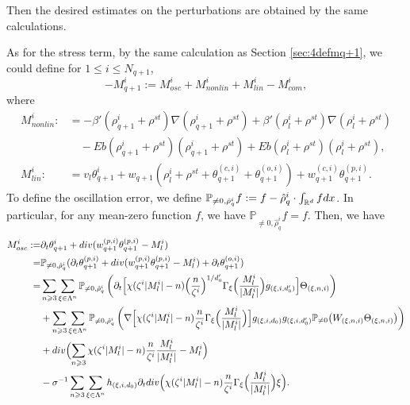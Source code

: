 \documentclass[10pt,a4paper]{amsart}
\numberwithin{equation}{section}
\def\dif{{\mathord{{\rm d}}}}
\def\geq{\geqslant}
\def\leq{\leqslant}
\def\div{\mathord{{\rm div}}}
\def\dif{{\mathord{{\rm d}}}}
\def\geq{\geqslant}
\def\leq{\leqslant}
\def\div{\mathord{{\rm div}}}
\begin{document}
 Then the desired estimates on the perturbations are obtained by the same calculations.
  
 
 As for the stress term, by the same calculation as Section \ref{sec:4defmq+1}, we could  define  for $1\leq i\leq N_{q+1}$,
$$-{M}^i _{q+1}:=M^i_{osc}+M^i_{nonlin}+M^i_{lin}-M^i_{com},$$
where \begin{align*} 
M^{i}_{nonlin}:&= -  \beta'(\rho^{i}_{q+1}+\rho^{st}) \nabla(\rho^{i}_{q+1}+\rho^{st})+\beta'(\rho^{i}_{l}+\rho^{st})\nabla (\rho^{i}_{l}+\rho^{st} )\\
&\quad-Eb( \rho_{q+1}^i+\rho^{st})(\rho_{q+1}^i+\rho^{st})+Eb(\rho_{l}^i+\rho^{st})(\rho_{l}^i+\rho^{st}),\\
M^{i}_{lin}:&=v_l\theta^{i}_{q+1}+w_{q+1}(\rho^{i}_l+\rho^{st}+\theta_{q+1}^{(c,i)}+\theta_{q+1}^{(o,i)}) +w_{q+1}^{(c,i)}\theta_{q+1}^{(p,i)}.
\end{align*}
 To define the oscillation error,  we define
$\mathbb{P}_{\neq 0,\hat{\rho}^i_q}f:=f- \hat{\rho}^i_q\cdot\int_{\mathbb{R}^d}f\dif x$.  
In particular, for any mean-zero function $f$, we have 
 $\mathbb{P}_{\neq 0,\hat{\rho}^i_q}f=f$. Then, we have 
\begin{align}
M^{i}_{osc}:= &\partial_t\theta^{i}_{q+1}+\div (w_{q+1}^{(p,i)}\theta_{q+1}^{(p,i)}-M^{i}_l)\notag\\
 =&\mathbb{P}_{\neq 0,\hat{\rho}^i_q} (\partial_t\theta^{(p,i)}_{q+1}+\div (w_{q+1}^{(p,i)}\theta_{q+1}^{(p,i)}-M^{i}_l)+\partial_t\theta^{(o,i)}_{q+1}
 )\notag\\ 
=
&
\sum_{n\geq3}
\sum_{\xi\in\Lambda^n}
\mathbb{P}_{\neq 0,\hat{\rho}^i_q}\left(\partial_t
\Bigl[
\chi(\zeta^i|M_l^i|-n)
\Bigl(\frac{n}{\zeta^i}\Bigr)^{1/d_0'}
\Gamma_\xi\Bigl(\frac{M_l^i}{|M_l^i|}\Bigr)
g_{(\xi,i,d_0')}
\Bigr]
\Theta_{(\xi,n,i)}\right)
\notag\\
&+
\sum_{n\geq3}
\sum_{\xi\in\Lambda^n}
\mathbb{P}_{\neq 0,\hat{\rho}^i_q}\left(\nabla
\Bigl[
\chi(\zeta^i|M_l^i|-n)
\frac{n}{\zeta^i}
\Gamma_\xi\Bigl(\frac{M_l^i}{|M_l^i|}\Bigr)
\Bigr]
g_{(\xi,i,d_0)}
g_{(\xi,i,d_0')}
\mathbb{P}_{\neq0}
\bigl(
W_{(\xi,n,i)}
\Theta_{(\xi,n,i)}
\bigr)
\right)\notag\\
&+
\div
\Bigl(
\sum_{n\geq3}
\chi(\zeta^i|M_l^i|-n)
\frac{n}{\zeta^i}
\frac{M_l^i}{|M_l^i|}
-
M_l^i
\Bigr)
\notag\\
&-
\sigma^{-1}
\sum_{n\geq3}
\sum_{\xi\in\Lambda^n}
h_{(\xi,i,d_0)}
\partial_t
\div
\Bigl(
\chi(\zeta^i|M_l^i|-n)
\frac{n}{\zeta^i}
\Gamma_\xi\Bigl(\frac{M_l^i}{|M_l^i|}\Bigr)
\xi
\Bigr).\notag
\end{align}
\end{document}

